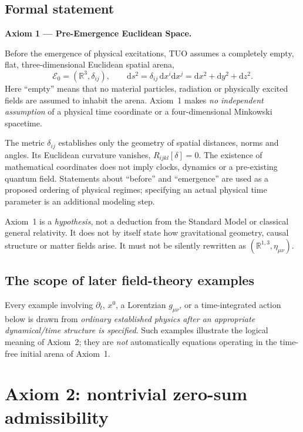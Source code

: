 \documentclass[11pt,a4paper]{article}
\newcommand{\R}{\mathbb{R}}
\newcommand{\dd}{\mathrm{d}}
\newcommand{\cE}{\mathcal E}
\theoremstyle{tmon}
\theoremstyle{definition}
\begin{document}
\subsection{Formal statement}
\begin{axiombox}
\textbf{Axiom 1 --- Pre-Emergence Euclidean Space.}

Before the emergence of physical excitations, TUO assumes a completely empty, flat, three-dimensional Euclidean spatial arena,
\begin{equation}\label{eq:a1}
\boxed{\cE_0=(\R^3,\delta_{ij}),\qquad \dd s^2=\delta_{ij}\,\dd x^i\dd x^j=\dd x^2+\dd y^2+\dd z^2.}
\end{equation}
Here ``empty'' means that no material particles, radiation or physically excited fields are assumed to inhabit the arena. Axiom~1 makes \emph{no independent assumption} of a physical time coordinate or a four-dimensional Minkowski spacetime.
\end{axiombox}

The metric $\delta_{ij}$ establishes only the geometry of spatial distances, norms and angles. Its Euclidean curvature vanishes, $R_{ijkl}[\delta]=0$. The existence of mathematical coordinates does not imply clocks, dynamics or a pre-existing quantum field. Statements about ``before'' and ``emergence'' are used as a proposed ordering of physical regimes; specifying an actual physical time parameter is an additional modeling step.

Axiom~1 is a \emph{hypothesis}, not a deduction from the Standard Model or classical general relativity. It does not by itself state how gravitational geometry, causal structure or matter fields arise. It must not be silently rewritten as $(\R^{1,3},\eta_{\mu\nu})$.

\subsection{The scope of later field-theory examples}
Every example involving $\partial_t$, $x^0$, a Lorentzian $g_{\mu\nu}$, or a time-integrated action below is drawn from \emph{ordinary established physics after an appropriate dynamical/time structure is specified}. Such examples illustrate the logical meaning of Axiom~2; they are \emph{not} automatically equations operating in the time-free initial arena of Axiom~1.

\section{Axiom 2: nontrivial zero-sum admissibility}
\end{document}
